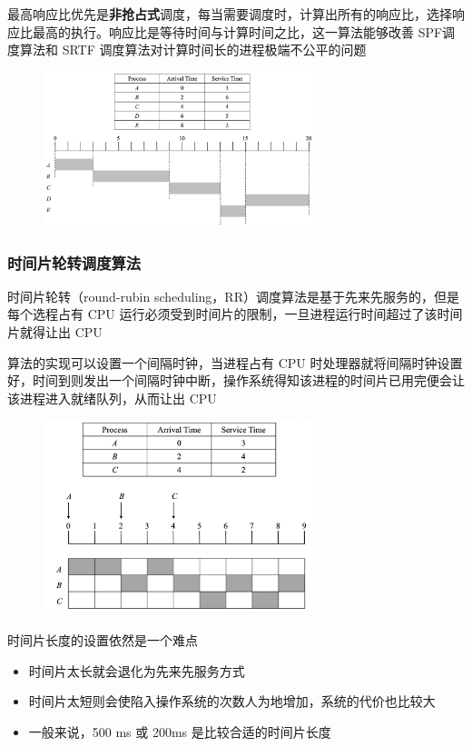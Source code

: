 \documentclass[cs4size,a4paper,10pt]{ctexart}
\begin{document}
	最高响应比优先是\textbf{非抢占式}调度，每当需要调度时，计算出所有的响应比，选择响应比最高的执行。响应比是等待时间与计算时间之比，这一算法能够改善 SPF调度算法和 SRTF 调度算法对计算时间长的进程极端不公平的问题
	\begin{figure}[H]
		\centering
		\includegraphics[width=0.7\textwidth]{img/HRRF}
	\end{figure}

	\subsubsection{时间片轮转调度算法}
	时间片轮转（round-rubin scheduling，RR）调度算法是基于先来先服务的，但是每个选程占有 CPU 运行必须受到时间片的限制，一旦进程运行时间超过了该时间片就得让出 CPU

	算法的实现可以设置一个间隔时钟，当进程占有 CPU 时处理器就将间隔时钟设置好，时间到则发出一个间隔时钟中断，操作系统得知该进程的时间片已用完便会让该进程进入就绪队列，从而让出 CPU

	\begin{figure}[H]
		\centering
		\includegraphics[width=0.7\textwidth]{img/RR}
	\end{figure}

	时间片长度的设置依然是一个难点
	\begin{itemize}
		\item 时间片太长就会退化为先来先服务方式
		\item 时间片太短则会使陷入操作系统的次数人为地增加，系统的代价也比较大
		\item 一般来说，500 ms 或 200ms 是比较合适的时间片长度
	\end{itemize}
\end{document}
